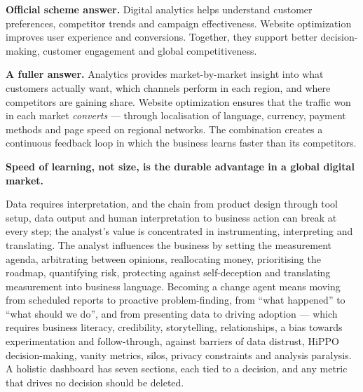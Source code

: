 \begin{exambox}
\textbf{Official scheme answer.} Digital analytics helps understand customer
preferences, competitor trends and campaign effectiveness. Website optimization
improves user experience and conversions. Together, they support better
decision-making, customer engagement and global competitiveness.

\smallskip
\textbf{A fuller answer.} Analytics provides market-by-market insight into what
customers actually want, which channels perform in each region, and where
competitors are gaining share. Website optimization ensures that the traffic won
in each market \emph{converts} --- through localisation of language, currency,
payment methods and page speed on regional networks. The combination creates a
continuous feedback loop in which the business learns faster than its competitors.

\smallskip
\textbf{Speed of learning, not size, is the durable advantage in a global digital
market.}
\end{exambox}

\begin{summarybox}
Data requires interpretation, and the chain from product design through tool
setup, data output and human interpretation to business action can break at every
step; the analyst's value is concentrated in instrumenting, interpreting and
translating. The analyst influences the business by setting the measurement
agenda, arbitrating between opinions, reallocating money, prioritising the
roadmap, quantifying risk, protecting against self-deception and translating
measurement into business language. Becoming a change agent means moving from
scheduled reports to proactive problem-finding, from ``what happened'' to ``what
should we do'', and from presenting data to driving adoption --- which requires
business literacy, credibility, storytelling, relationships, a bias towards
experimentation and follow-through, against barriers of data distrust,
HiPPO decision-making, vanity metrics, silos, privacy constraints and analysis
paralysis. A holistic dashboard has seven sections, each tied to a decision, and
any metric that drives no decision should be deleted.
\end{summarybox}
